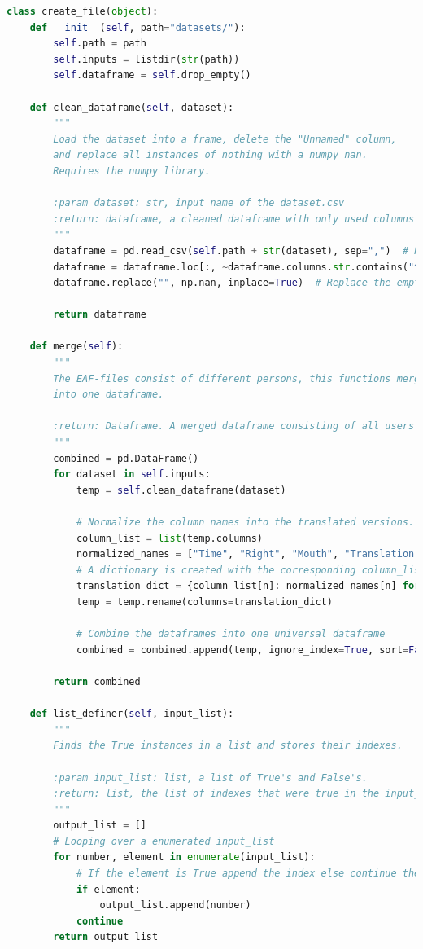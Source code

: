 \label{apx:first}
\begin{lstlisting}[language=Python, caption=Shown is the Python code to merge the multiple CSV-files into one DataFrame. \cite{gijsgithub}]
class create_file(object):
    def __init__(self, path="datasets/"):
        self.path = path
        self.inputs = listdir(str(path))
        self.dataframe = self.drop_empty()

    def clean_dataframe(self, dataset):
        """
        Load the dataset into a frame, delete the "Unnamed" column,
        and replace all instances of nothing with a numpy nan.
        Requires the numpy library.

        :param dataset: str, input name of the dataset.csv
        :return: dataframe, a cleaned dataframe with only used columns
        """
        dataframe = pd.read_csv(self.path + str(dataset), sep=",")  # Read into a frame
        dataframe = dataframe.loc[:, ~dataframe.columns.str.contains("^Unnamed")]  # Drop the "^Unnamed" column
        dataframe.replace("", np.nan, inplace=True)  # Replace the empty values with a nan

        return dataframe

    def merge(self):
        """
        The EAF-files consist of different persons, this functions merges those
        into one dataframe.

        :return: Dataframe. A merged dataframe consisting of all users.
        """
        combined = pd.DataFrame()
        for dataset in self.inputs:
            temp = self.clean_dataframe(dataset)

            # Normalize the column names into the translated versions.
            column_list = list(temp.columns)
            normalized_names = ["Time", "Right", "Mouth", "Translation", "Left"]
            # A dictionary is created with the corresponding column_list name and the normalized name
            translation_dict = {column_list[n]: normalized_names[n] for n in range(len(normalized_names))}
            temp = temp.rename(columns=translation_dict)

            # Combine the dataframes into one universal dataframe
            combined = combined.append(temp, ignore_index=True, sort=False)

        return combined

    def list_definer(self, input_list):
        """
        Finds the True instances in a list and stores their indexes.

        :param input_list: list, a list of True's and False's.
        :return: list, the list of indexes that were true in the input_list.
        """
        output_list = []
        # Looping over a enumerated input_list
        for number, element in enumerate(input_list):
            # If the element is True append the index else continue the loop
            if element:
                output_list.append(number)
            continue
        return output_list


\end{lstlisting}
